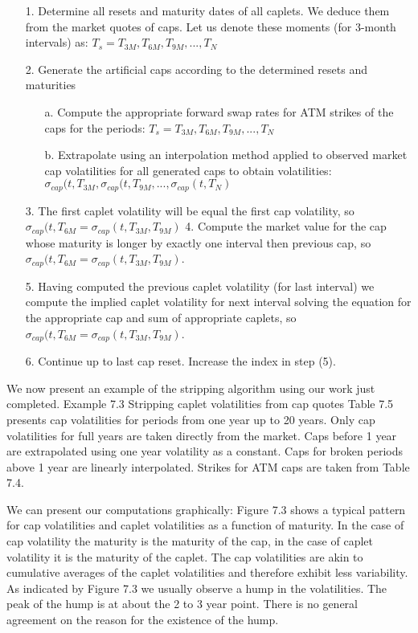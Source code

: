 \documentclass[11pt]{article}
\numberwithin{equation}{subsection}
\begin{document}
\begin{enumerate}
	\item [1.] Determine all resets and maturity dates of all caplets. We deduce them from the market
	quotes of caps. Let us denote these moments (for 3-month intervals) as: 
	\(T_s=T_{3M}, T_{6M}, T_{9M}, ...,T_{N}\)
	\item [2.] Generate the artificial caps according to the determined resets and maturities
	\begin{enumerate}
		\item [a.] Compute the appropriate forward swap rates for ATM strikes of the caps for the
		periods: \(T_s=T_{3M}, T_{6M}, T_{9M}, ...,T_{N}\)
		\item [b.] Extrapolate using an interpolation method applied to observed market
		cap volatilities for all generated caps to obtain volatilities:
		\(\sigma_{cap}(t, T_{3M}, \sigma_{cap}(t, T_{9M},..., \sigma_{cap}(t, T_{N})\)
	\end{enumerate}
	\item [3.] The first caplet volatility will be equal the first cap volatility, so \(\sigma_{cap}(t, T_{6M} = \sigma_{cap}(t, T_{3M}, T_{9M})\)
	4. Compute the market value for the cap whose maturity is longer by exactly one interval
	then previous cap, so \(\sigma_{cap}(t, T_{6M} = \sigma_{cap}(t, T_{3M}, T_{9M})\).
	\item [5.] Having computed the previous caplet volatility (for last interval) we compute the implied
	caplet volatility for next interval solving the equation for the appropriate cap and sum of
	appropriate caplets, so \(\sigma_{cap}(t, T_{6M} = \sigma_{cap}(t, T_{3M}, T_{9M})\).
	\item [6.] Continue up to last cap reset. Increase the index in step (5).
\end{enumerate}


We now present an example of the stripping algorithm using our work just completed.
Example 7.3 Stripping caplet volatilities from cap quotes
Table 7.5 presents cap volatilities for periods from one year up to 20 years. Only cap volatilities
for full years are taken directly from the market. Caps before 1 year are extrapolated
using one year volatility as a constant. Caps for broken periods above 1 year are linearly
interpolated. Strikes for ATM caps are taken from Table 7.4.



We can present our computations graphically:
Figure 7.3 shows a typical pattern for cap volatilities and caplet volatilities as a function
of maturity. In the case of cap volatility the maturity is the maturity of the cap, in the case
of caplet volatility it is the maturity of the caplet. The cap volatilities are akin to cumulative
averages of the caplet volatilities and therefore exhibit less variability. As indicated by
Figure 7.3 we usually observe a hump in the volatilities. The peak of the hump is at about
the 2 to 3 year point. There is no general agreement on the reason for the existence of
the hump.
\end{document}
